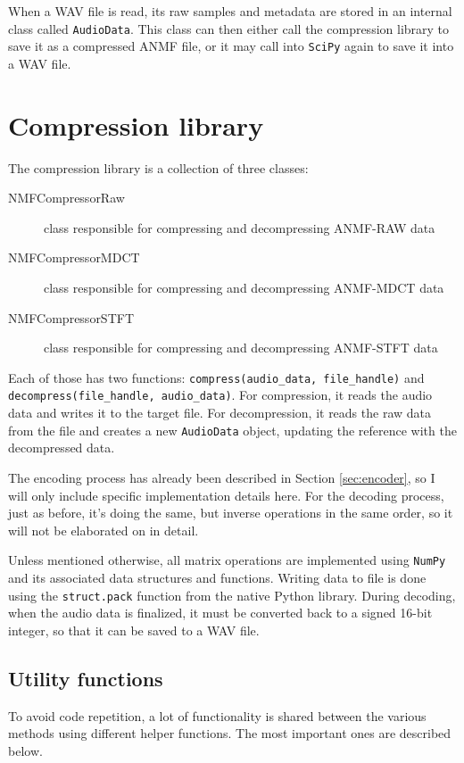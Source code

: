 When a WAV file is read, its raw samples and metadata are stored in an internal class called \verb|AudioData|. This class can then either call the compression library to save it as a compressed ANMF file, or it may call into \verb|SciPy| again to save it into a WAV file.

\section{Compression library}
The compression library is a collection of three classes:

\begin{description}
	\item[NMFCompressorRaw] class responsible for compressing and decompressing ANMF-RAW data
	\item[NMFCompressorMDCT] class responsible for compressing and decompressing ANMF-MDCT data
	\item[NMFCompressorSTFT] class responsible for compressing and decompressing ANMF-STFT data
\end{description}

Each of those has two functions: \verb|compress(audio_data, file_handle)| and \verb|decompress(file_handle, audio_data)|. For compression, it reads the audio data and writes it to the target file. For decompression, it reads the raw data from the file and creates a new \verb|AudioData| object, updating the reference with the decompressed data.

The encoding process has already been described in Section \ref{sec:encoder}, so I will only include specific implementation details here. For the decoding process, just as before, it's doing the same, but inverse operations in the same order, so it will not be elaborated on in detail.

Unless mentioned otherwise, all matrix operations are implemented using \verb|NumPy| and its associated data structures and functions. Writing data to file is done using the \verb|struct.pack| function from the native Python library. During decoding, when the audio data is finalized, it must be converted back to a signed 16-bit integer, so that it can be saved to a WAV file.

\subsection{Utility functions}
To avoid code repetition, a lot of functionality is shared between the various methods using different helper functions. The most important ones are described below.

